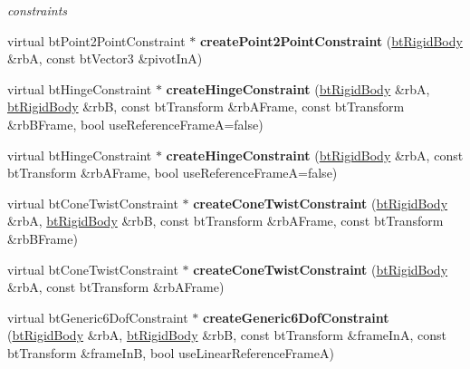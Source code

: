 \begin{DoxyCompactItemize}
\begin{DoxyCompactList}\small\item\em constraints \end{DoxyCompactList}\item 
\hypertarget{classbt_world_importer_aa01949736bee92ba89bd81ebc567781e}{virtual bt\+Point2\+Point\+Constraint $\ast$ {\bfseries create\+Point2\+Point\+Constraint} (\hyperlink{classbt_rigid_body}{bt\+Rigid\+Body} \&rb\+A, const bt\+Vector3 \&pivot\+In\+A)}\label{classbt_world_importer_aa01949736bee92ba89bd81ebc567781e}

\item 
\hypertarget{classbt_world_importer_aa5e34abe969471c2e9772944a502b91c}{virtual bt\+Hinge\+Constraint $\ast$ {\bfseries create\+Hinge\+Constraint} (\hyperlink{classbt_rigid_body}{bt\+Rigid\+Body} \&rb\+A, \hyperlink{classbt_rigid_body}{bt\+Rigid\+Body} \&rb\+B, const bt\+Transform \&rb\+A\+Frame, const bt\+Transform \&rb\+B\+Frame, bool use\+Reference\+Frame\+A=false)}\label{classbt_world_importer_aa5e34abe969471c2e9772944a502b91c}

\item 
\hypertarget{classbt_world_importer_a32c49633d6db8b1d139166c7cbfc24ae}{virtual bt\+Hinge\+Constraint $\ast$ {\bfseries create\+Hinge\+Constraint} (\hyperlink{classbt_rigid_body}{bt\+Rigid\+Body} \&rb\+A, const bt\+Transform \&rb\+A\+Frame, bool use\+Reference\+Frame\+A=false)}\label{classbt_world_importer_a32c49633d6db8b1d139166c7cbfc24ae}

\item 
\hypertarget{classbt_world_importer_a42d29b6639791e025923239e3a7bddab}{virtual bt\+Cone\+Twist\+Constraint $\ast$ {\bfseries create\+Cone\+Twist\+Constraint} (\hyperlink{classbt_rigid_body}{bt\+Rigid\+Body} \&rb\+A, \hyperlink{classbt_rigid_body}{bt\+Rigid\+Body} \&rb\+B, const bt\+Transform \&rb\+A\+Frame, const bt\+Transform \&rb\+B\+Frame)}\label{classbt_world_importer_a42d29b6639791e025923239e3a7bddab}

\item 
\hypertarget{classbt_world_importer_af17c119c389c9cb95e6853f52f3ff522}{virtual bt\+Cone\+Twist\+Constraint $\ast$ {\bfseries create\+Cone\+Twist\+Constraint} (\hyperlink{classbt_rigid_body}{bt\+Rigid\+Body} \&rb\+A, const bt\+Transform \&rb\+A\+Frame)}\label{classbt_world_importer_af17c119c389c9cb95e6853f52f3ff522}

\item 
\hypertarget{classbt_world_importer_a6d379c31d2ab1a596309bbdf80b64d3c}{virtual bt\+Generic6\+Dof\+Constraint $\ast$ {\bfseries create\+Generic6\+Dof\+Constraint} (\hyperlink{classbt_rigid_body}{bt\+Rigid\+Body} \&rb\+A, \hyperlink{classbt_rigid_body}{bt\+Rigid\+Body} \&rb\+B, const bt\+Transform \&frame\+In\+A, const bt\+Transform \&frame\+In\+B, bool use\+Linear\+Reference\+Frame\+A)}\label{classbt_world_importer_a6d379c31d2ab1a596309bbdf80b64d3c}


\end{DoxyCompactItemize}
